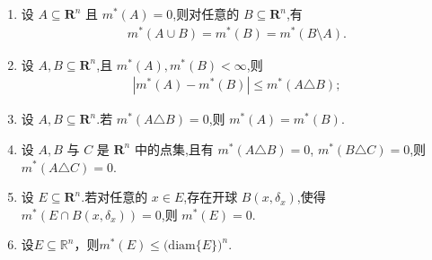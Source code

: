 \documentclass[../../main.tex]{subfiles}%
\begin{document}
\begin{proposition}\label{proposition:外测度相关的基本性质}
\begin{enumerate}[(1)]
\item 设 $A\subseteq\mathbf{R}^n$ 且 $m^*(A)=0$,则对任意的 $B\subseteq\mathbf{R}^n$,有
\begin{align*}
m^*(A\cup B)=m^*(B)=m^*(B\setminus A).
\end{align*}
\item 设 $A,B\subseteq\mathbf{R}^n$,且 $m^*(A),m^*(B)<\infty$,则
\begin{align*}
|m^*(A)-m^*(B)|\leqslant m^*(A\triangle B);
\end{align*}
\item 设 $A,B\subseteq\mathbf{R}^n$.若 $m^*(A\triangle B)=0$,则 $m^*(A)=m^*(B)$.
\item 设 $A,B$ 与 $C$ 是 $\mathbf{R}^n$ 中的点集,且有 $m^*(A\triangle B)=0$, $m^*(B\triangle C)=0$,则 $m^*(A\triangle C)=0$.
\item 设 $E\subseteq\mathbf{R}^n$.若对任意的 $x\in E$,存在开球 $B(x,\delta_x)$,使得 $m^*(E\cap B(x,\delta_x))=0$,则 $m^*(E)=0$.

\item\label{proposition:外测度相关的基本性质-6} 设$E\subseteq \mathbb{R}^n$，则$m^*(E) \leqslant \bigl(\mathrm{diam}\{E\}\bigr)^n$.
\end{enumerate}
\end{proposition}
\end{document}
